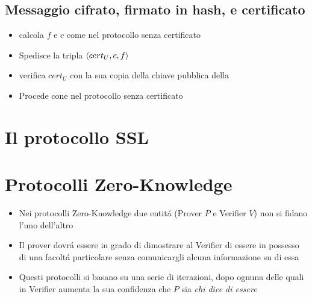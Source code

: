 \subsection{Messaggio cifrato, firmato in hash, e certificato}

\begin{itemize}
    \item {} calcola $f$ e $c$ come nel protocollo senza certificato
    \item Spedisce la tripla $\langle cert_U, c, f\rangle$
    \item {} verifica $cert_U$ con la sua copia della chiave pubblica della 
    \item Procede cone nel protocollo senza certificato
\end{itemize}

\section{Il protocollo SSL}

\section{Protocolli Zero-Knowledge}

\begin{itemize}
    \item Nei protocolli Zero-Knowledge due entit\'a (Prover $P$ e Verifier $V$) non si fidano l'uno dell'altro
    \item Il prover dovr\'a essere in grado di dimostrare al Verifier di essere in possesso di una facolt\'a particolare senza comunicargli alcuna informazione su di essa
    \item Questi protocolli si basano su una serie di iterazioni, dopo ognuna delle quali in Verifier aumenta la sua confidenza che $P$ sia \textit{chi dice di essere}
\end{itemize}